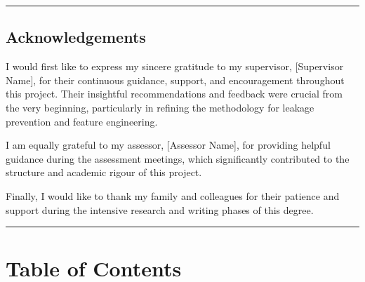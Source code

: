 \begin{center}\rule{0.5\linewidth}{0.5pt}\end{center}

\subsection{Acknowledgements}\label{acknowledgements}

I would first like to express my sincere gratitude to my supervisor,
{[}Supervisor Name{]}, for their continuous guidance, support, and
encouragement throughout this project. Their insightful recommendations
and feedback were crucial from the very beginning, particularly in
refining the methodology for leakage prevention and feature engineering.

I am equally grateful to my assessor, {[}Assessor Name{]}, for providing
helpful guidance during the assessment meetings, which significantly
contributed to the structure and academic rigour of this project.

Finally, I would like to thank my family and colleagues for their
patience and support during the intensive research and writing phases of
this degree.

\begin{center}\rule{0.5\linewidth}{0.5pt}\end{center}

\section{Table of Contents}\label{table-of-contents}

